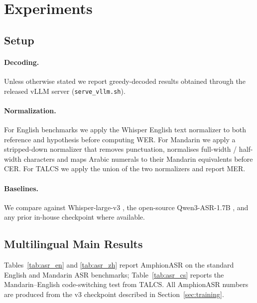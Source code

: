 \section{Experiments}
\label{sec:experiments}

\subsection{Setup}
\label{subsec:setup}

\paragraph{Decoding.}
Unless otherwise stated we report greedy-decoded results obtained
through the released vLLM server (\texttt{serve\_vllm.sh}).

\paragraph{Normalization.}
For English benchmarks we apply the Whisper English text normalizer
\cite{radford2023whisper} to both reference and hypothesis before
computing WER. For Mandarin we apply a stripped-down normalizer that
removes punctuation, normalises full-width / half-width characters and
maps Arabic numerals to their Mandarin equivalents before CER.
For TALCS we apply the union of the two normalizers and report MER.

\paragraph{Baselines.}
We compare against Whisper-large-v3 \cite{radford2023whisper}, the
open-source Qwen3-ASR-1.7B \cite{qwen2025qwen3asr}, and any prior
in-house checkpoint where available.

\subsection{Multilingual Main Results}

Tables~\ref{tab:asr_en} and \ref{tab:asr_zh} report AmphionASR on the
standard English and Mandarin ASR benchmarks; Table~\ref{tab:asr_cs}
reports the Mandarin--English code-switching test from TALCS. All
AmphionASR numbers are produced from the v3 checkpoint described in
Section~\ref{sec:training}.

